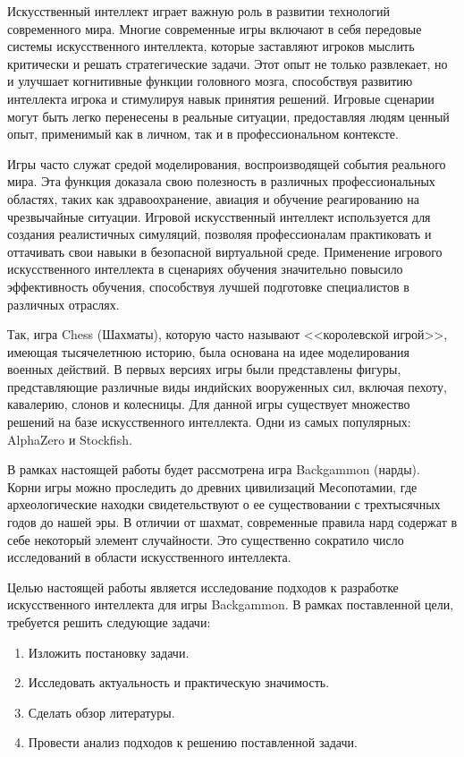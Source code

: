 Искусственный интеллект играет важную роль в развитии технологий современного мира. Многие современные игры включают в себя передовые системы искусственного интеллекта, которые заставляют игроков мыслить критически и решать стратегические задачи. Этот опыт не только развлекает, но и улучшает когнитивные функции головного мозга, способствуя развитию интеллекта игрока и стимулируя навык принятия решений. Игровые сценарии могут быть легко перенесены в реальные ситуации, предоставляя людям ценный опыт, применимый как в личном, так и в профессиональном контексте.

Игры часто служат средой моделирования, воспроизводящей события реального мира. Эта функция доказала свою полезность в различных профессиональных областях, таких как здравоохранение, авиация и обучение реагированию на чрезвычайные ситуации. Игровой искусственный интеллект используется для создания реалистичных симуляций, позволяя профессионалам практиковать и оттачивать свои навыки в безопасной виртуальной среде. Применение игрового искусственного интеллекта в сценариях обучения значительно повысило эффективность обучения, способствуя лучшей подготовке специалистов в различных отраслях.

Так, игра Chess (Шахматы), которую часто называют <<королевской игрой>>, имеющая тысячелетнюю историю, была основана на идее моделирования военных действий. В первых версиях игры были представлены фигуры, представляющие различные виды индийских вооруженных сил, включая пехоту, кавалерию, слонов и колесницы. Для данной игры существует множество решений на базе искусственного интеллекта. Одни из самых популярных: AlphaZero и Stockfish.

В рамках настоящей работы будет рассмотрена игра Backgammon (нарды). Корни игры можно проследить до древних цивилизаций Месопотамии, где археологические находки свидетельствуют о ее существовании с трехтысячных годов до нашей эры. В отличии от шахмат, современные правила нард содержат в себе некоторый элемент случайности. Это существенно сократило число исследований в области искусственного интеллекта.

Целью настоящей работы является исследование подходов к разработке искусственного интеллекта для игры Backgammon. В рамках поставленной цели, требуется решить следующие задачи:
\begin{enumerate}
\item Изложить постановку задачи.
\item Исследовать актуальность и практическую значимость.
\item Сделать обзор литературы.
\item Провести анализ подходов к решению поставленной задачи.
\end{enumerate}
